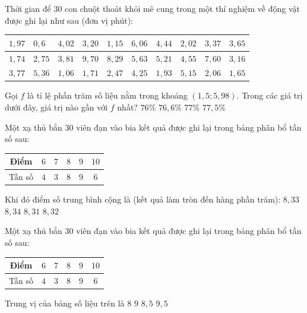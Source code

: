\begin{ex}%
    Thời gian để $30$ con chuột thoát khỏi mê cung trong một thí nghiệm về động vật được ghi lại như sau (đơn vị phút):
    \begin{center}
        \begin{tabular}{|l|l|l|l|l|l|l|l|l|l|}
        \hline 
        $1{,}97$ & $0{,}6$ & $4{,}02$ & $3{,}20$ & $1{,}15$ & $6{,}06$ & $4{,}44$ & $2{,}02$ & $3{,}37$ & $3{,}65$ \\
        \hline 
        $1{,}74$ & $2{,}75$ & $3{,}81$ & $9{,}70$ & $8{,}29$ & $5{,}63$ & $5{,}21$ & $4{,}55$ & $7{,}60$ & $3{,}16$ \\
        \hline 
        $3{,}77$ & $5{,}36$ & $1{,}06$ & $1{,}71$ & $2{,}47$ & $4{,}25$ & $1{,}93$ & $5{,}15$ & $2{,}06$ & $1{,}65$ \\
        \hline
    \end{tabular}
    \end{center}
    Gọi $f$ là tỉ lệ phần trăm số liệu nằm trong khoảng $(1{,}5; 5{,}98)$. Trong các giá trị dưới đây, giá trị nào gần với $f$ nhất?
    \choice
    {$76 \%$}
    {\True $76{,}6 \%$}
    {$77 \%$}
    {$77{,}5 \%$}
\end{ex}
\begin{ex}%
    Một xạ thủ bắn $30$ viên đạn vào bia kết quả được ghi lại trong bảng phân bổ tần số sau:
    \begin{center}
        \begin{tabular}{|c|c|c|c|c|c|}
            \hline Điểm & $6$ & $7$ & $8$ & $9$ & $10$\\
            \hline Tần số & $4$ & $3$ & $8$ & $9$ & $6$\\
            \hline
        \end{tabular}
    \end{center}
    Khi đó điểm số trung bình cộng là (kết quả làm tròn đến hàng phần trăm):
    \choice
    {\True $8{,}33$}
    {$8{,}34$}
    {$8{,}31$}
    {$8{,}32$}
\end{ex}
\begin{ex}%
    Một xạ thủ bắn $30$ viên đạn vào bia kết quả được ghi lại trong bảng phân bổ tần số sau:
    \begin{center}
        \begin{tabular}{|c|c|c|c|c|c|}
            \hline Điểm & $6$ & $7$ & $8$ & $9$ & $10$\\
            \hline Tần số & $4$ & $3$ & $8$ & $9$ & $6$\\
            \hline
        \end{tabular}
    \end{center}
    Trung vị của bảng số liệu trên là
    \choice
    {$8$}
    {$9$}
    {\True $8{,}5$}
    {$9{,}5$}
\end{ex}

